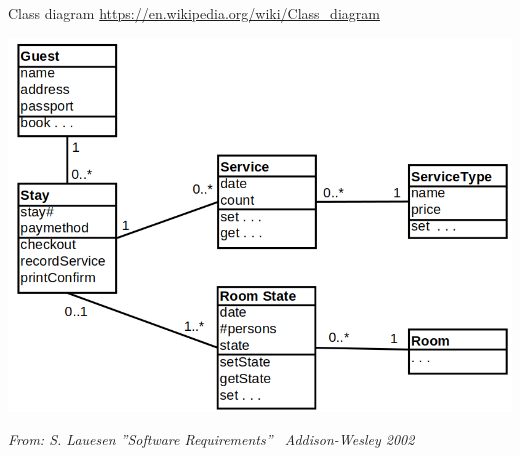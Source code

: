 \begin{Slide}{Class diagram}
\footnotesize\url{https://en.wikipedia.org/wiki/Class_diagram}

\begin{minipage}[t]{0.82\textwidth}
\vspace{-0.4em}\includegraphics[width=1.0\textwidth]{../img/uml-class-diagram}
\vspace{-1.4em}
\end{minipage}

{\hfill\fontsize{5}{5}\itshape\selectfont From: S. Lauesen ''Software Requirements'' \textcopyright~Addison-Wesley 2002}



\end{Slide}
